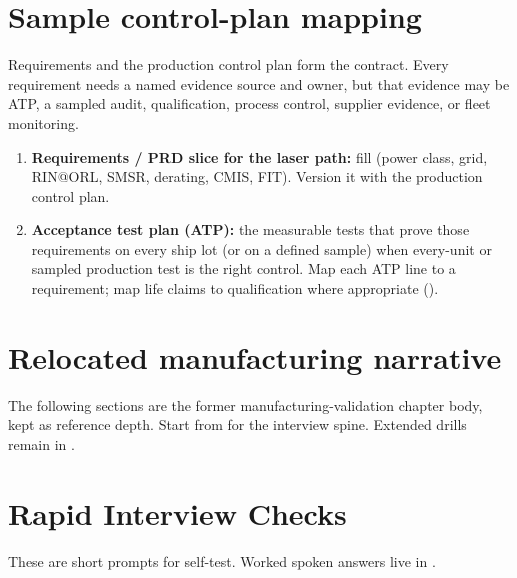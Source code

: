 \section{Sample control-plan mapping}
\label{sec:mfg-control-plan-map}

Requirements and the production control plan form the contract. Every
requirement needs a named evidence source and owner, but that evidence may be
ATP, a sampled audit, qualification, process control, supplier evidence, or
fleet monitoring.

\begin{enumerate}
\item \textbf{Requirements / PRD slice for the laser path:} fill
       (power class, grid, RIN@ORL, SMSR,
      derating, CMIS, FIT). Version it with the production control plan.
\item \textbf{Acceptance test plan (ATP):} the measurable tests that prove those
      requirements on every ship lot (or on a defined sample) when every-unit or
      sampled production test is the right control. Map each ATP line to a
      requirement; map life claims to qualification where appropriate
      ().
\end{enumerate}


\section{Relocated manufacturing narrative}
\label{sec:relocated-manufacturing-narrative}

The following sections are the former manufacturing-validation chapter body,
kept as reference depth. Start from  for the interview
spine. Extended drills remain in
.



\section{Rapid Interview Checks}

These are short prompts for self-test. Worked spoken answers live in
.

